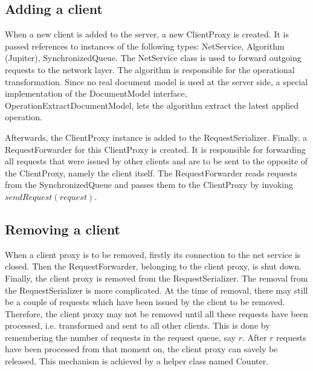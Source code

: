\subsection{Adding a client}
When a new client is added to the server, a new ClientProxy is created. It is passed references to instances of the following types: NetService, Algorithm (Jupiter), SynchronizedQueue. The NetService class is used to forward outgoing requests to the network layer. The algorithm is responsible for the operational transformation. Since no real document model is used at the server side, a special implementation of the DocumentModel interface, OperationExtractDocumentModel, lets the algorithm extract the latest applied operation.

Afterwards, the ClientProxy instance is added to the RequestSerializer. Finally, a RequestForwarder for this ClientProxy is created. It is responsible for forwarding all requests that were issued by other clients and are to be sent to the opposite of the ClientProxy, namely the client itself. The RequestForwarder reads requests from the SynchronizedQueue and passes them to the ClientProxy by invoking $sendRequest(request)$.

\subsection{Removing a client}
When a client proxy is to be removed, firstly its connection to the net service is closed. Then the RequestForwarder, belonging to the client proxy, is shut down. Finally, the client proxy is removed from the RequestSerializer. The removal from the RequestSerializer is more complicated. At the time of removal, there may still be a couple of requests which have been issued by the client to be removed. Therefore, the client proxy may not be removed until all these requests have been processed, i.e. transformed and sent to all other clients. This is done by remembering the number of requests in the request queue, say $r$. After $r$ requests have been processed from that moment on, the client proxy can savely be released. This mechanism is achieved by a helper class named Counter.

